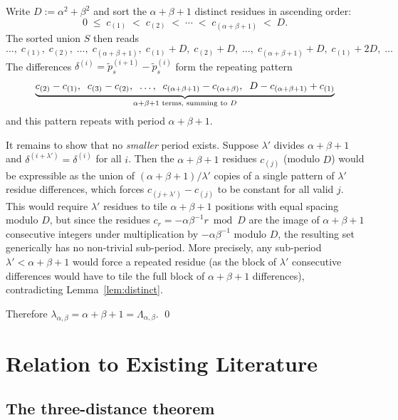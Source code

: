 \documentclass[11pt]{article}
\theoremstyle{plain}
\theoremstyle{definition}
\theoremstyle{remark}
\begin{document}
Write $D := \alpha^2 + \beta^2$ and sort the $\alpha+\beta+1$ distinct residues
in ascending order:
\[
    0 \;\le\; c_{(1)} \;<\; c_{(2)} \;<\; \cdots \;<\; c_{(\alpha+\beta+1)}
    \;<\; D.
\]
The sorted union $S$ then reads
\[
    \ldots,\;
    c_{(1)},\; c_{(2)},\; \ldots,\; c_{(\alpha+\beta+1)},\;
    c_{(1)}+D,\; c_{(2)}+D,\; \ldots,\; c_{(\alpha+\beta+1)}+D,\;
    c_{(1)}+2D,\; \ldots
\]
The differences $\delta^{(i)} = \tilde{p}^{(i+1)}_s - \tilde{p}^{(i)}_s$
form the repeating pattern
\begin{equation}\label{eq:pattern}
    \underbrace{%
        c_{(2)}-c_{(1)},\;\;
        c_{(3)}-c_{(2)},\;\;
        \ldots,\;\;
        c_{(\alpha+\beta+1)}-c_{(\alpha+\beta)},\;\;
        D - c_{(\alpha+\beta+1)} + c_{(1)}
    }_{\alpha+\beta+1 \text{ terms, summing to } D}
\end{equation}
and this pattern repeats with period $\alpha+\beta+1$.

It remains to show that no \emph{smaller} period exists.  Suppose $\lambda'$
divides $\alpha+\beta+1$ and $\delta^{(i+\lambda')} = \delta^{(i)}$ for all $i$.
Then the $\alpha+\beta+1$ residues $c_{(j)}$ (modulo $D$) would be expressible
as the union of $(\alpha+\beta+1)/\lambda'$ copies of a single pattern of
$\lambda'$ residue differences, which forces $c_{(j+\lambda')} - c_{(j)}$ to
be constant for all valid $j$.  This would require $\lambda'$ residues to tile
$\alpha+\beta+1$ positions with equal spacing modulo $D$, but since the residues
$c_r = -\alpha\beta^{-1}r \bmod D$ are the image of $\alpha+\beta+1$ consecutive
integers under multiplication by $-\alpha\beta^{-1}$ modulo $D$, the resulting
set generically has no non-trivial sub-period.  More precisely, any sub-period
$\lambda' < \alpha+\beta+1$ would force a repeated residue
(as the block of $\lambda'$ consecutive differences would have to tile the full
block of $\alpha+\beta+1$ differences), contradicting
Lemma~\ref{lem:distinct}.

Therefore $\lambda_{\alpha,\beta} = \alpha + \beta + 1 =
\Lambda_{\alpha,\beta}$.  \qed

\section{Relation to Existing Literature}\label{sec:literature}

\subsection{The three-distance theorem}
\end{document}
